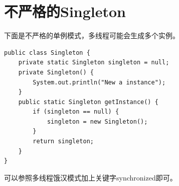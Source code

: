 \section{不严格的Singleton}
下面是不严格的单例模式，多线程可能会生成多个实例。
\begin{lstlisting}
public class Singleton {
	private static Singleton singleton = null;
	private Singleton() {
		System.out.println("New a instance");
	}
	public static Singleton getInstance() {
		if (singleton == null) {
			singleton = new Singleton();
		}
		return singleton;
	}
}
\end{lstlisting}
\par 可以参照多线程饿汉模式加上关键字synchronized即可。